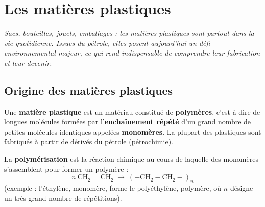 \chapter{Les matières plastiques}

\noindent\textit{Sacs, bouteilles, jouets, emballages : les matières plastiques sont
partout dans la vie quotidienne. Issues du pétrole, elles posent aujourd'hui un défi
environnemental majeur, ce qui rend indispensable de comprendre leur fabrication et leur
devenir.}
\vspace{8pt}

\connecteBanner

\section{Origine des matières plastiques}

\begin{definition}
Une \textbf{matière plastique} est un matériau constitué de \textbf{polymères},
c'est-à-dire de longues molécules formées par l'\textbf{enchaînement répété} d'un grand
nombre de petites molécules identiques appelées \textbf{monomères}. La plupart des
plastiques sont fabriqués à partir de dérivés du pétrole (pétrochimie).
\end{definition}

\begin{propriete}[Polymérisation]
La \textbf{polymérisation} est la réaction chimique au cours de laquelle des monomères
s'assemblent pour former un polymère :
\[
n\ \mathrm{CH_2\!=\!CH_2}\ \longrightarrow\ \mathrm{(-CH_2-CH_2-)}_n
\]
(exemple : l'éthylène, monomère, forme le polyéthylène, polymère, où $n$ désigne un très
grand nombre de répétitions).
\end{propriete}

\begin{illus}
\end{illus}

